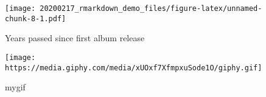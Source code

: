 \documentclass[]{article}
\begin{document}
\begin{figure}
\centering
\texttt{[image: 20200217\_rmarkdown\_demo\_files/figure-latex/unnamed-chunk-8-1.pdf]}
\caption{Years passed since first album release}
\end{figure}

\begin{figure}
\centering
\texttt{[image: https://media.giphy.com/media/xUOxf7XfmpxuSode1O/giphy.gif]}
\caption{mygif}
\end{figure}
\end{document}

